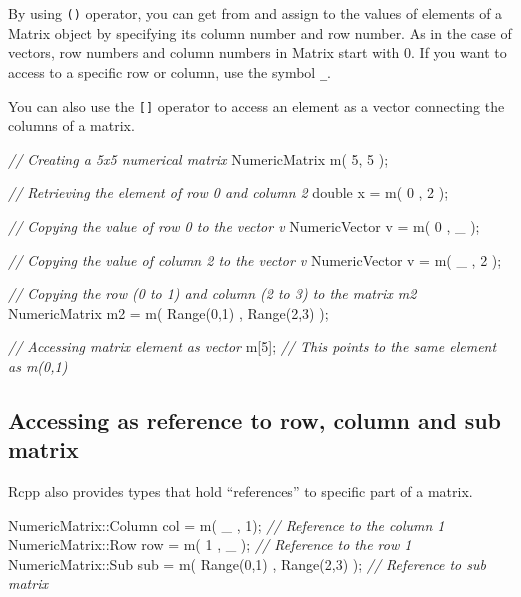 \documentclass[]{book}
\newenvironment{Shaded}{\begin{snugshade}}{\end{snugshade}}
\newcommand{\CommentTok}[1]{\textcolor[rgb]{0.56,0.35,0.01}{\textit{#1}}}
\newcommand{\DataTypeTok}[1]{\textcolor[rgb]{0.13,0.29,0.53}{#1}}
\newcommand{\DecValTok}[1]{\textcolor[rgb]{0.00,0.00,0.81}{#1}}
\newcommand{\NormalTok}[1]{#1}
\begin{document}
By using \texttt{()} operator, you can get from and assign to the values of elements of a Matrix object by specifying its column number and row number. As in the case of vectors, row numbers and column numbers in Matrix start with 0. If you want to access to a specific row or column, use the symbol \texttt{\_}.

You can also use the \texttt{{[}{]}} operator to access an element as a vector connecting the columns of a matrix.

\begin{Shaded}
\begin{Highlighting}[]
\CommentTok{// Creating a 5x5 numerical matrix}
\NormalTok{NumericMatrix m( }\DecValTok{5}\NormalTok{, }\DecValTok{5}\NormalTok{ );}

\CommentTok{// Retrieving the element of row 0 and column 2}
\DataTypeTok{double}\NormalTok{ x = m( }\DecValTok{0}\NormalTok{ , }\DecValTok{2}\NormalTok{ );}

\CommentTok{// Copying the value of row 0 to the vector v}
\NormalTok{NumericVector v = m( }\DecValTok{0}\NormalTok{ , _ );}

\CommentTok{// Copying the value of column 2 to the vector v}
\NormalTok{NumericVector v = m( _ , }\DecValTok{2}\NormalTok{ );}

\CommentTok{// Copying the row (0 to 1) and column (2 to 3) to the matrix m2}
\NormalTok{NumericMatrix m2 = m( Range(}\DecValTok{0}\NormalTok{,}\DecValTok{1}\NormalTok{) , Range(}\DecValTok{2}\NormalTok{,}\DecValTok{3}\NormalTok{) );}

\CommentTok{// Accessing matrix element as vector}
\NormalTok{m[}\DecValTok{5}\NormalTok{]; }\CommentTok{// This points to the same element as m(0,1)}
\end{Highlighting}
\end{Shaded}

\hypertarget{accessing-as-reference-to-row-column-and-sub-matrix}{%
\subsection{Accessing as reference to row, column and sub matrix}\label{accessing-as-reference-to-row-column-and-sub-matrix}}

Rcpp also provides types that hold ``references'' to specific part of a matrix.

\begin{Shaded}
\begin{Highlighting}[]
\NormalTok{NumericMatrix::Column col = m( _ , }\DecValTok{1}\NormalTok{);  }\CommentTok{// Reference to the column 1}
\NormalTok{NumericMatrix::Row    row = m( }\DecValTok{1}\NormalTok{ , _ ); }\CommentTok{// Reference to the row 1}
\NormalTok{NumericMatrix::Sub    sub = m( Range(}\DecValTok{0}\NormalTok{,}\DecValTok{1}\NormalTok{) , Range(}\DecValTok{2}\NormalTok{,}\DecValTok{3}\NormalTok{) ); }\CommentTok{// Reference to sub matrix}
\end{Highlighting}
\end{Shaded}
\end{document}
